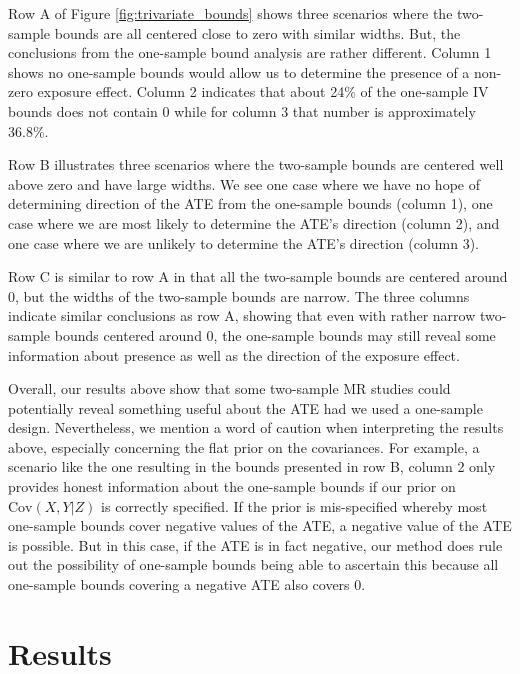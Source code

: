 \documentclass[
]{article}
\theoremstyle{plain}
\begin{document}
Row A of Figure \ref{fig:trivariate_bounds} shows three scenarios where the two-sample bounds are all centered close to zero with similar widths. But, the conclusions from the one-sample bound analysis are rather different. Column 1 shows no one-sample bounds would allow us to determine the presence of a non-zero exposure effect. Column 2 indicates that about 24\% of the one-sample IV bounds does not contain \(0\) while for column 3 that number is approximately 36.8\%.

Row B illustrates three scenarios where the two-sample bounds are centered well above zero and have large widths. We see one case where we have no hope of determining direction of the ATE from the one-sample bounds (column 1), one case where we are most likely to determine the ATE's direction (column 2), and one case where we are unlikely to determine the ATE's direction (column 3).

Row C is similar to row A in that all the two-sample bounds are centered around 0, but the widths of the two-sample bounds are narrow. The three columns indicate similar conclusions as row A, showing that even with rather narrow two-sample bounds centered around 0, the one-sample bounds may still reveal some information about presence as well as the direction of the exposure effect.

Overall, our results above show that some two-sample MR studies could potentially reveal something useful about the ATE had we used a one-sample design. Nevertheless, we mention a word of caution when interpreting the results above, especially concerning the flat prior on the covariances. For example, a scenario like the one resulting in the bounds presented in row B, column 2 only provides honest information about the one-sample bounds if our prior on \(\text{Cov}(X,Y|Z)\) is correctly specified. If the prior is mis-specified whereby most one-sample bounds cover negative values of the ATE, a negative value of the ATE is possible. But in this case, if the ATE is in fact negative, our method does rule out the possibility of one-sample bounds being able to ascertain this because all one-sample bounds covering a negative ATE also covers \(0\).

\hypertarget{results}{%
\section{\texorpdfstring{Results \label{data-analysis}}{Results }}\label{results}}
\end{document}

